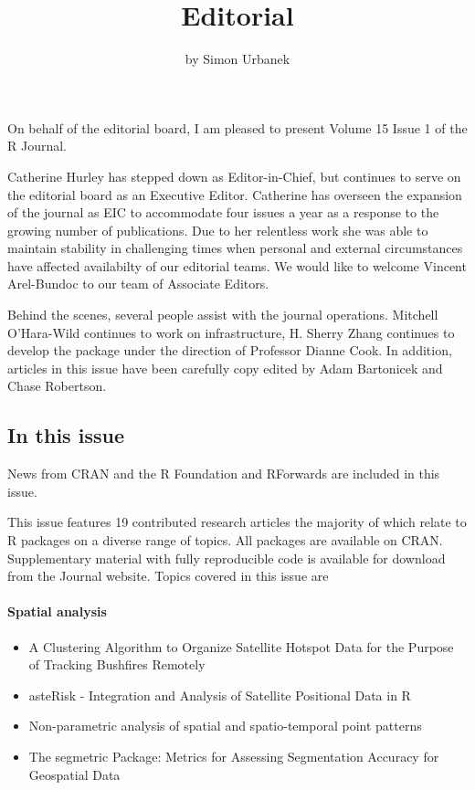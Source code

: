 \title{Editorial}


\author{by Simon Urbanek}

\maketitle


On behalf of the editorial board, I am pleased to present Volume 15 Issue 1 of the R Journal.

Catherine Hurley has stepped down as Editor-in-Chief, but continues to serve on the editorial board as an Executive Editor.
Catherine has overseen the expansion of the journal as EIC to accommodate four issues a year as a response to the growing number of publications.
Due to her relentless work she was able to maintain stability in challenging times when personal and external circumstances have affected availabilty of our editorial teams. We would like to welcome Vincent Arel-Bundoc to our team of Associate Editors.

Behind the scenes, several people assist with the journal operations. Mitchell O'Hara-Wild continues to work on infrastructure, H. Sherry Zhang continues to develop the  package under the direction of Professor Dianne Cook. In addition, articles in this issue have been carefully copy edited by Adam Bartonicek and Chase Robertson.

\hypertarget{in-this-issue}{%
\subsection{In this issue}\label{in-this-issue}}

News from CRAN and the R Foundation and RForwards are included in this issue.

\noindent This issue features 19 contributed research articles the majority of which relate to R packages
on a diverse range of topics. All packages are available on CRAN. Supplementary material with fully reproducible code is available for download from the Journal website. Topics covered in this issue are

\hypertarget{spatial-analysis}{%
\paragraph{Spatial analysis}\label{spatial-analysis}}

\begin{itemize}
\tightlist
\item
  A Clustering Algorithm to Organize Satellite Hotspot Data for the Purpose of Tracking Bushfires Remotely
\item
  asteRisk - Integration and Analysis of Satellite Positional Data in R
\item
  Non-parametric analysis of spatial and spatio-temporal point patterns
\item
  The segmetric Package: Metrics for Assessing Segmentation Accuracy for Geospatial Data
\end{itemize}

